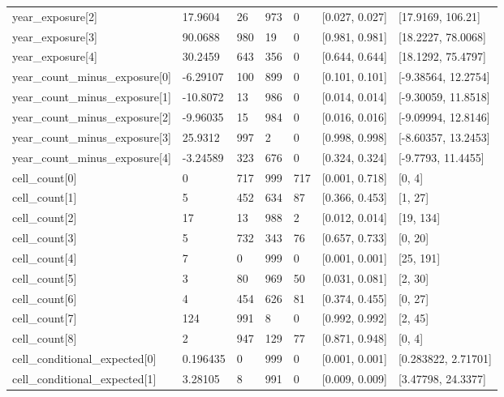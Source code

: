 \begin{longtable}
{}year\_\allowbreak{}exposure[2] & 17.9604 & 26 & 973 & 0 & [0.027, 0.027] & [17.9169, 106.21] \\
{}year\_\allowbreak{}exposure[3] & 90.0688 & 980 & 19 & 0 & [0.981, 0.981] & [18.2227, 78.0068] \\
{}year\_\allowbreak{}exposure[4] & 30.2459 & 643 & 356 & 0 & [0.644, 0.644] & [18.1292, 75.4797] \\
{}year\_\allowbreak{}count\_\allowbreak{}minus\_\allowbreak{}exposure[0] & -6.29107 & 100 & 899 & 0 & [0.101, 0.101] & [-9.38564, 12.2754] \\
{}year\_\allowbreak{}count\_\allowbreak{}minus\_\allowbreak{}exposure[1] & -10.8072 & 13 & 986 & 0 & [0.014, 0.014] & [-9.30059, 11.8518] \\
{}year\_\allowbreak{}count\_\allowbreak{}minus\_\allowbreak{}exposure[2] & -9.96035 & 15 & 984 & 0 & [0.016, 0.016] & [-9.09994, 12.8146] \\
{}year\_\allowbreak{}count\_\allowbreak{}minus\_\allowbreak{}exposure[3] & 25.9312 & 997 & 2 & 0 & [0.998, 0.998] & [-8.60357, 13.2453] \\
{}year\_\allowbreak{}count\_\allowbreak{}minus\_\allowbreak{}exposure[4] & -3.24589 & 323 & 676 & 0 & [0.324, 0.324] & [-9.7793, 11.4455] \\
{}cell\_\allowbreak{}count[0] & 0 & 717 & 999 & 717 & [0.001, 0.718] & [0, 4] \\
{}cell\_\allowbreak{}count[1] & 5 & 452 & 634 & 87 & [0.366, 0.453] & [1, 27] \\
{}cell\_\allowbreak{}count[2] & 17 & 13 & 988 & 2 & [0.012, 0.014] & [19, 134] \\
{}cell\_\allowbreak{}count[3] & 5 & 732 & 343 & 76 & [0.657, 0.733] & [0, 20] \\
{}cell\_\allowbreak{}count[4] & 7 & 0 & 999 & 0 & [0.001, 0.001] & [25, 191] \\
{}cell\_\allowbreak{}count[5] & 3 & 80 & 969 & 50 & [0.031, 0.081] & [2, 30] \\
{}cell\_\allowbreak{}count[6] & 4 & 454 & 626 & 81 & [0.374, 0.455] & [0, 27] \\
{}cell\_\allowbreak{}count[7] & 124 & 991 & 8 & 0 & [0.992, 0.992] & [2, 45] \\
{}cell\_\allowbreak{}count[8] & 2 & 947 & 129 & 77 & [0.871, 0.948] & [0, 4] \\
{}cell\_\allowbreak{}conditional\_\allowbreak{}expected[0] & 0.196435 & 0 & 999 & 0 & [0.001, 0.001] & [0.283822, 2.71701] \\
{}cell\_\allowbreak{}conditional\_\allowbreak{}expected[1] & 3.28105 & 8 & 991 & 0 & [0.009, 0.009] & [3.47798, 24.3377] \\

\end{longtable}
